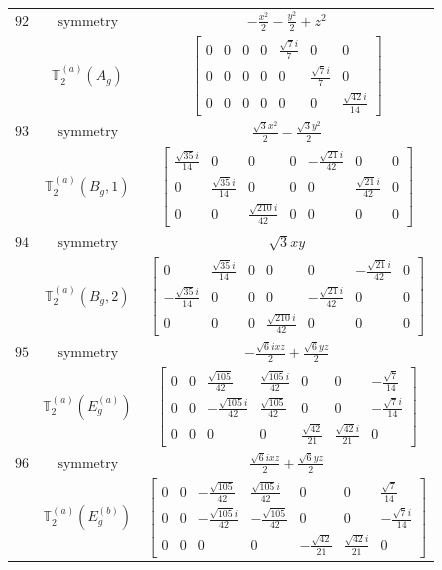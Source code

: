 \documentclass[fleqn,8pt,landscape]{jsarticle}
\begin{document}
\begin{longtable}{ccc}
$ 92 $ & $ \text{symmetry} $ & $ - \frac{x^{2}}{2} - \frac{y^{2}}{2} + z^{2} $ \\
$  $ & $ \mathbb{T}_{2}^{(a)}(A_{g}) $ & $ \begin{bmatrix} 0 & 0 & 0 & 0 & \frac{\sqrt{7} i}{7} & 0 & 0 \\ 0 & 0 & 0 & 0 & 0 & \frac{\sqrt{7} i}{7} & 0 \\ 0 & 0 & 0 & 0 & 0 & 0 & \frac{\sqrt{42} i}{14} \end{bmatrix} $ \\ \hline
$ 93 $ & $ \text{symmetry} $ & $ \frac{\sqrt{3} x^{2}}{2} - \frac{\sqrt{3} y^{2}}{2} $ \\
$  $ & $ \mathbb{T}_{2}^{(a)}(B_{g},1) $ & $ \begin{bmatrix} \frac{\sqrt{35} i}{14} & 0 & 0 & 0 & - \frac{\sqrt{21} i}{42} & 0 & 0 \\ 0 & \frac{\sqrt{35} i}{14} & 0 & 0 & 0 & \frac{\sqrt{21} i}{42} & 0 \\ 0 & 0 & \frac{\sqrt{210} i}{42} & 0 & 0 & 0 & 0 \end{bmatrix} $ \\ \hline
$ 94 $ & $ \text{symmetry} $ & $ \sqrt{3} x y $ \\
$  $ & $ \mathbb{T}_{2}^{(a)}(B_{g},2) $ & $ \begin{bmatrix} 0 & \frac{\sqrt{35} i}{14} & 0 & 0 & 0 & - \frac{\sqrt{21} i}{42} & 0 \\ - \frac{\sqrt{35} i}{14} & 0 & 0 & 0 & - \frac{\sqrt{21} i}{42} & 0 & 0 \\ 0 & 0 & 0 & \frac{\sqrt{210} i}{42} & 0 & 0 & 0 \end{bmatrix} $ \\ \hline
$ 95 $ & $ \text{symmetry} $ & $ - \frac{\sqrt{6} i x z}{2} + \frac{\sqrt{6} y z}{2} $ \\
$  $ & $ \mathbb{T}_{2}^{(a)}(E_{g}^{(a)}) $ & $ \begin{bmatrix} 0 & 0 & \frac{\sqrt{105}}{42} & \frac{\sqrt{105} i}{42} & 0 & 0 & - \frac{\sqrt{7}}{14} \\ 0 & 0 & - \frac{\sqrt{105} i}{42} & \frac{\sqrt{105}}{42} & 0 & 0 & - \frac{\sqrt{7} i}{14} \\ 0 & 0 & 0 & 0 & \frac{\sqrt{42}}{21} & \frac{\sqrt{42} i}{21} & 0 \end{bmatrix} $ \\ \hline
$ 96 $ & $ \text{symmetry} $ & $ \frac{\sqrt{6} i x z}{2} + \frac{\sqrt{6} y z}{2} $ \\
$  $ & $ \mathbb{T}_{2}^{(a)}(E_{g}^{(b)}) $ & $ \begin{bmatrix} 0 & 0 & - \frac{\sqrt{105}}{42} & \frac{\sqrt{105} i}{42} & 0 & 0 & \frac{\sqrt{7}}{14} \\ 0 & 0 & - \frac{\sqrt{105} i}{42} & - \frac{\sqrt{105}}{42} & 0 & 0 & - \frac{\sqrt{7} i}{14} \\ 0 & 0 & 0 & 0 & - \frac{\sqrt{42}}{21} & \frac{\sqrt{42} i}{21} & 0 \end{bmatrix} $ \\ \hline

\end{longtable}
\end{document}
